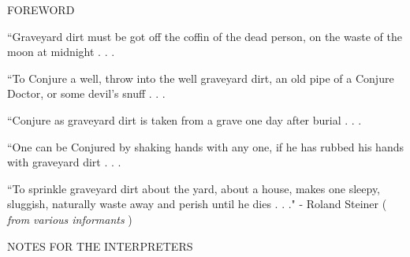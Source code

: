 \documentclass[12pt]{article}
\begin{document}
\begin{center}
\huge FOREWORD
\end{center}

\begingroup
\begin{center}
``Graveyard dirt must be got off the coffin of the dead person, on the waste of the moon at midnight . . . 
\end{center}
\endgroup

\begingroup
\begin{center}
``To Conjure a well, throw into the well graveyard dirt, an old pipe of a Conjure Doctor, or some devil's snuff . . . 
\end{center}
\endgroup

\begingroup
\begin{center}
``Conjure as graveyard dirt is taken from a grave one day after burial . . . 
\end{center}
\endgroup

\begingroup
\begin{center}
``One can be Conjured by shaking hands with any one, if he has rubbed his hands with graveyard dirt . . . 
\end{center}
\endgroup

\begingroup
\begin{center}
``To sprinkle graveyard dirt about the yard, about a house, makes one sleepy, sluggish, naturally waste away and perish until he dies . . ." 
\rightskip\leftskip
\phantom{text} \hfill - Roland Steiner ( \textit{from various informants} )
\end{center}
\endgroup

\begin{center}
\huge NOTES FOR THE INTERPRETERS
\end{center}
\end{document}
